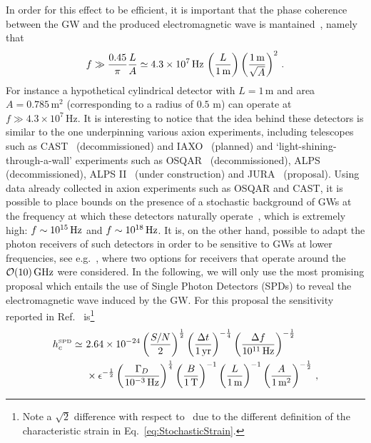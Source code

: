 \documentclass[11pt,a4paper]{article}
\begin{document}
In order for this effect to be efficient, it is important that the phase coherence between the GW and the produced electromagnetic wave is mantained~\cite{Ringwald:2020ist}, namely that
\begin{equation}
\label{eq:PhaseCoherence}
f \gg \frac{0.45}{\pi} \frac{L}{A} \simeq 4.3 \times 10^7 \, {\rm Hz} \, \left(\frac{L}{{1 \, \text{m}}}\right) \left(\frac{{1 \, \text{m}}}{\sqrt{A}}\right)^2 \,.
\end{equation}
For instance a hypothetical cylindrical detector with $L = 1 \, \text{m}$ and area $A = 0.785 \, \text{m}^2$ (corresponding to a radius of $0.5$ m) can operate at $f \gg 4.3 \times 10^7 \, \text{Hz}$. It is interesting to notice that the idea behind these detectors is similar to the one underpinning various axion experiments, including telescopes such as CAST~\cite{Zioutas:1998cc, GraciaGarza:2015sos} (decommissioned) and IAXO~\cite{Ruz:2018omp} (planned) and ‘light-shining-through-a-wall’ experiments such as OSQAR~\cite{OSQAR:2015qdv, OSQAR:2013jqp} (decommissioned), ALPS~\cite{ALPS:2009des, Ehret:2010mh} (decommissioned), ALPS II~\cite{Bahre:2013ywa, Albrecht:2020ntd} (under construction) and JURA~\cite{Beacham:2019nyx} (proposal).
Using data already collected in axion experiments such as OSQAR and CAST, it is possible to place bounds on the presence of a stochastic background of GWs at the frequency at which these detectors naturally operate~\cite{Ejlli:2019bqj}, which is extremely high: $f \sim 10^{15} \, {\rm Hz}$ and $f \sim 10^{18} \, {\rm Hz}$. It is, on the other hand, possible to adapt the photon receivers of such detectors in order to be sensitive to GWs at lower frequencies, see e.g.~\cite{Ringwald:2020ist}, where two options for receivers that operate around the $\mathcal{O}(10) \, {\rm GHz}$ were considered. In the following, we will only use the most promising proposal which entails the use of Single Photon Detectors
 (SPDs) to reveal the electromagnetic wave induced by the GW. For this proposal the sensitivity reported in Ref.~\cite{Ringwald:2020ist} is\footnote{Note a $\sqrt{2}$ difference with respect to~\cite{Ringwald:2020ist} due to the different definition of the characteristic strain in Eq.~\eqref{eq:StochasticStrain}.}
\begin{align}
h_c^{\text{\tiny SPD}} \simeq \,\,
&2.64 \times 10^{-24} \left(\frac{S/N}{2}\right)^{\frac{1}{2}}\left(\frac{\Delta t}{{1 \,\rm yr}}\right)^{-\frac{1}{4}} \left(\frac{\Delta f}{10^{11} \, {\rm Hz}}\right)^{-\frac{1}{2}} \nonumber \\
& \times \epsilon^{-\frac{1}{2}} \left(\frac{\Gamma_D}{10^{-3} \, {\rm Hz}}\right)^{\frac{1}{4}} \left(\frac{B}{1 \, \text{T}}\right)^{-1} \left(\frac{L}{1 \, \text{m}}\right)^{-1} \left(\frac{A}{1 \, \text{m}^2}\right)^{-\frac{1}{2}} \,,
\label{eq:SPDsensitivity}
\end{align}
\end{document}
